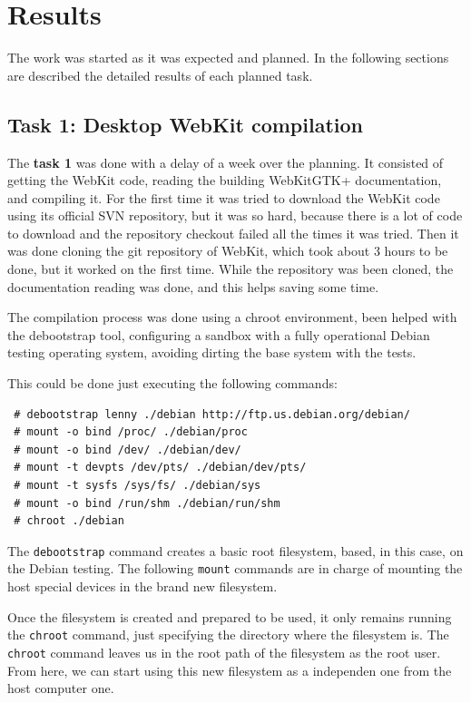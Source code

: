 \documentclass[a4paper,11pt,openany]{report}
\begin{document}
\chapter{Results}
The work was started as it was expected and planned. In the following sections are described the detailed results of each planned task.

\section{Task 1: Desktop WebKit compilation}
The \textbf{task 1} was done with a delay of a week over the planning. It consisted of getting the WebKit code, reading the building WebKitGTK+\cite{build webkitgtk+} documentation, and compiling it.
For the first time it was tried to download the WebKit code using its official SVN repository, but it was so hard, because there is a lot of code to download and the repository checkout failed all the times it was tried. Then it was done cloning the git repository of WebKit\cite{git webkit}, which took about 3 hours to be done, but it worked on the first time.
While the repository was been cloned, the documentation reading was done, and this helps saving some time.

The compilation process was done using a chroot\cite{chroot} environment, been helped with the debootstrap\cite{debootstrap} tool, configuring a sandbox with a fully operational Debian testing operating system, avoiding dirting the base system with the tests.

This could be done just executing the following commands:
\begin{verbatim}
 # debootstrap lenny ./debian http://ftp.us.debian.org/debian/
 # mount -o bind /proc/ ./debian/proc
 # mount -o bind /dev/ ./debian/dev/
 # mount -t devpts /dev/pts/ ./debian/dev/pts/
 # mount -t sysfs /sys/fs/ ./debian/sys
 # mount -o bind /run/shm ./debian/run/shm
 # chroot ./debian
\end{verbatim}

The \verb#debootstrap# command creates a basic root filesystem, based, in this case, on the Debian testing. The following \verb#mount# commands are in charge of mounting the host special devices in the brand new filesystem.

Once the filesystem is created and prepared to be used, it only remains running the \verb#chroot# command, just specifying the directory where the filesystem is. The \verb#chroot# command leaves us in the root path of the filesystem as the root user. From here, we can start using this new filesystem as a independen one from the host computer one.
\end{document}
